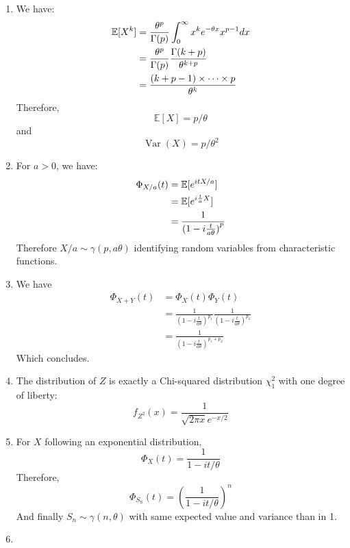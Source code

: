
\begin{solution}
  \begin{enumerate}
    \item We have:
          \begin{align*}
            \mathbb{E}[X^k] & = \frac{\theta^p}{\Gamma(p)} \int_0^\infty x^k e^{-\theta x} x^{p-1} dx \\
                            & = \frac{\theta^p}{\Gamma(p)} \frac{\Gamma(k+p)}{\theta^{k+p}}           \\
                            & = \frac{(k+p-1) \times \cdots \times p}{\theta^k}
          \end{align*}
          Therefore,
          \[\mathbb{E}[X]=p / \theta \]
          and
          \[\operatorname{Var}(X)=p / \theta^{2}\]
    \item For $a > 0$, we have:
          \begin{align*}
            \Phi_{X/a}(t) & = \mathbb{E}[e^{itX/a}]                   \\
                          & = \mathbb{E}[e^{i\frac{t}{a}X}]           \\
                          & = \frac{1}{{(1-i \frac{t}{a\theta})}^{p}}
          \end{align*}
          Therefore $X/a \sim \gamma(p, a\theta)$ identifying random variables from characteristic functions.
    \item We have
          \begin{align*}
            \Phi_{X+Y}(t) & = \Phi_{X}(t) \Phi_{Y}(t)                                                             \\
                          & = \frac{1}{{(1-i \frac{t}{a\theta})}^{p_1}} \frac{1}{{(1-i \frac{t}{a\theta})}^{p_2}} \\
                          & = \frac{1}{{(1-i \frac{t}{a\theta})}^{p_1 + p_2}}
          \end{align*}
          Which concludes.
    \item The distribution of $Z$ is exactly a Chi-squared distribution $\chi^2_1$ with one degree of liberty:
          \[
            f_{Z^2} (x) = \frac{1}{\sqrt{2 \pi x} e^{-x/2}}
          \]
    \item For $X$ following an exponential distribution,
          \[
            \Phi_X(t) = \frac{1}{1 - it/\theta}
          \]
          Therefore,
          \[
            \Phi_{S_n}(t) = {\left( \frac{1}{1 - it/\theta} \right)}^n
          \]
          And finally $S_n \sim \gamma(n, \theta)$ with same expected value and variance than in 1.
    \item

  \end{enumerate}
\end{solution}